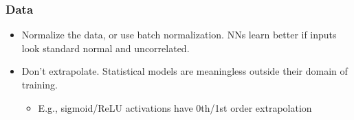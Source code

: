 \begin{frame}
    \frametitle{Data}

    \begin{itemize}
        \item<+-> \alert{Normalize the data, or use batch normalization.}
        NNs learn better if inputs look standard normal and uncorrelated.
        \item<+-> \alert{Don't extrapolate.}
        Statistical models are meaningless outside their domain of training.
        \begin{itemize}
            \item E.g., sigmoid/ReLU activations have 0th/1st order extrapolation
        \end{itemize}
    \end{itemize}

    \begin{columns}
        \begin{column}{0.4\textwidth}
            \centering
            \footnotesize

        \end{column}

        \begin{column}{0.6\textwidth}
            \centering
            \footnotesize

        \end{column}
    \end{columns}
\end{frame}

